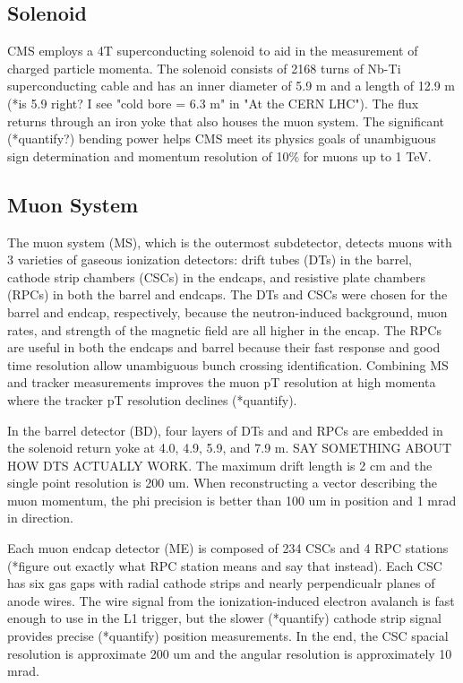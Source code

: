 \documentclass[12pt]{article}
\begin{document}
\subsection{Solenoid}
        CMS employs a 4T superconducting solenoid to aid in the measurement of charged particle momenta. The solenoid consists of 2168 turns of Nb-Ti superconducting cable and has an inner diameter of 5.9 m and a length of 12.9 m (*is 5.9 right? I see "cold bore = 6.3 m" in "At the CERN LHC"). The flux returns through an iron yoke that also houses the muon system. The significant (*quantify?) bending power helps CMS meet its physics goals of unambiguous sign determination and momentum resolution of 10\% for muons up to 1 TeV.

\subsection{Muon System}
        The muon system (MS), which is the outermost subdetector, detects muons with 3 varieties of gaseous ionization detectors: drift tubes (DTs) in the barrel, cathode strip chambers (CSCs) in the endcaps, and resistive plate chambers (RPCs) in both the barrel and endcaps. The DTs and CSCs were chosen for the barrel and endcap, respectively, because the neutron-induced background, muon rates, and strength of the magnetic field are all higher in the encap. The RPCs are useful in both the endcaps and barrel because their fast response and good time resolution allow unambiguous bunch crossing identification. Combining MS and tracker measurements improves the muon pT resolution at high momenta where the tracker pT resolution declines (*quantify).

        In the barrel detector (BD), four layers of DTs and and RPCs are embedded in the solenoid return yoke at 4.0, 4.9, 5.9, and 7.9 m. SAY SOMETHING ABOUT HOW DTS ACTUALLY WORK. The maximum drift length is 2 cm and the single point resolution is 200 um. When reconstructing a vector describing the muon momentum, the phi precision is better than 100 um in position and 1 mrad in direction. 

        Each muon endcap detector (ME) is composed of 234 CSCs and 4 RPC stations (*figure out exactly what RPC station means and say that instead). Each CSC has six gas gaps with radial cathode strips and nearly perpendicualr planes of anode wires. The wire signal from the ionization-induced electron avalanch is fast enough to use in the L1 trigger, but the slower (*quantify) cathode strip signal provides precise (*quantify) position measurements. In the end, the CSC spacial resolution is approximate 200 um and the angular resolution is approximately 10 mrad.
\end{document}
